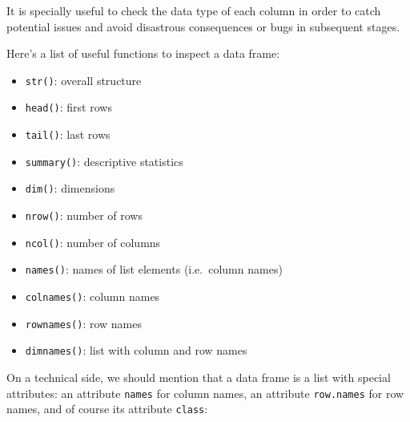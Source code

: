 \documentclass[
]{book}
\providecommand{\tightlist}{%
  \setlength{\itemsep}{0pt}\setlength{\parskip}{0pt}}
\begin{document}
It is specially useful to check the data type of each column in order to catch
potential issues and avoid disastrous consequences or bugs in subsequent stages.

Here's a list of useful functions to inspect a data frame:

\begin{itemize}
\tightlist
\item
  \texttt{str()}: overall structure
\item
  \texttt{head()}: first rows
\item
  \texttt{tail()}: last rows
\item
  \texttt{summary()}: descriptive statistics
\item
  \texttt{dim()}: dimensions
\item
  \texttt{nrow()}: number of rows
\item
  \texttt{ncol()}: number of columns
\item
  \texttt{names()}: names of list elements (i.e.~column names)
\item
  \texttt{colnames()}: column names
\item
  \texttt{rownames()}: row names
\item
  \texttt{dimnames()}: list with column and row names
\end{itemize}

On a technical side, we should mention that a data frame is a list with special
attributes: an attribute \texttt{names} for column names, an attribute
\texttt{row.names} for row names, and of course its attribute \texttt{class}:
\end{document}
